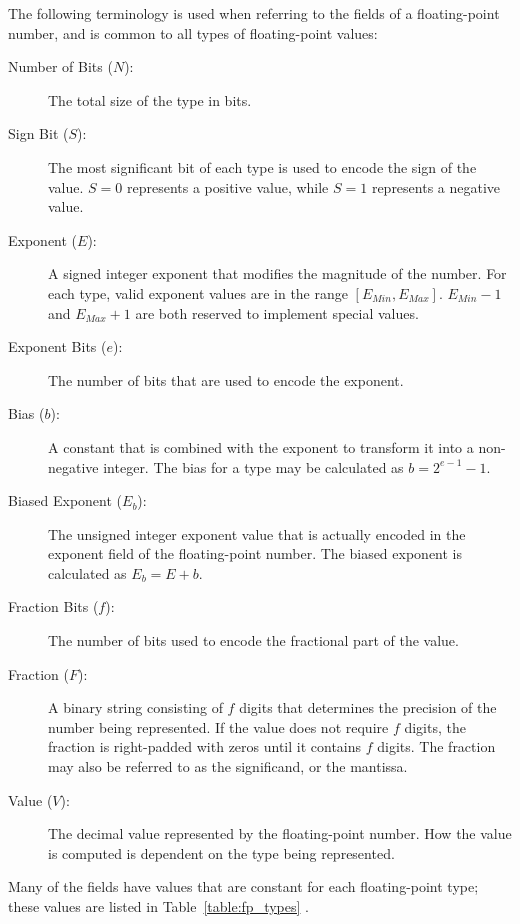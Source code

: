 The following terminology is used when referring to the fields of a floating-point number, and is common to all types of floating-point values:

\begin{description}
	\item[Number of Bits ($N$):]
		The total size of the type in bits.
	\item[Sign Bit ($S$):]
		The most significant bit of each type is used to encode the sign of the value. $S=0$ represents a positive value, while $S=1$ represents a negative value.
	\item[Exponent ($E$):]
		A signed integer exponent that modifies the magnitude of the number. For each type, valid exponent values are in the range $[E_{Min}, E_{Max}]$. $E_{Min} - 1$ and $E_{Max} + 1$ are both reserved to implement special values.
	\item[Exponent Bits ($e$):]
		The number of bits that are used to encode the exponent.
  \item[Bias ($b$):]
    A constant that is combined with the exponent to transform it into a non-negative integer. The bias for a type may be calculated as $b = 2^{e-1} - 1$.
  \item[Biased Exponent ($E_{b}$):]
    The unsigned integer exponent value that is actually encoded in the exponent field of the floating-point number. The biased exponent is calculated as $E_{b} = E + b$.
	\item[Fraction Bits ($f$):]
		The number of bits used to encode the fractional part of the value.
	\item[Fraction ($F$):]
		A binary string consisting of $f$ digits that determines the precision of the number being represented. If the value does not require $f$ digits, the fraction is right-padded with zeros until it contains $f$ digits. The fraction may also be referred to as the significand, or the mantissa.
	\item[Value ($V$):]
		The decimal value represented by the floating-point number. How the value is computed is dependent on the type being represented.
\end{description}

Many of the fields have values that are constant for each floating-point type; these values are listed in Table~\ref{table:fp_types} \cite{Goldberg:91}.


